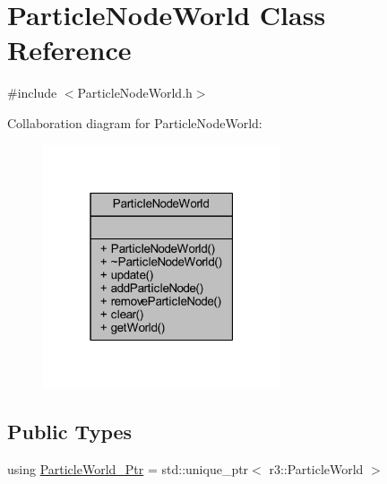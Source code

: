 \hypertarget{class_particle_node_world}{}\section{Particle\+Node\+World Class Reference}
\label{class_particle_node_world}


{\ttfamily \#include $<$Particle\+Node\+World.\+h$>$}



Collaboration diagram for Particle\+Node\+World\+:\nopagebreak
\begin{figure}[H]
\begin{center}
\leavevmode
\includegraphics[width=199pt]{class_particle_node_world__coll__graph}
\end{center}
\end{figure}
\subsection*{Public Types}
\begin{DoxyCompactItemize}
\item 
using \mbox{\hyperlink{class_particle_node_world_a7d4a427af20c82cbcba2670899392f33}{Particle\+World\+\_\+\+Ptr}} = std\+::unique\+\_\+ptr$<$ r3\+::\+Particle\+World $>$
\end{DoxyCompactItemize}
